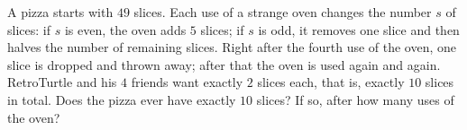 A pizza starts with $49$ slices. Each use of a strange oven changes the number $s$ of slices: if $s$ is even, the oven adds $5$ slices; if $s$ is odd, it removes one slice and then halves the number of remaining slices. Right after the fourth use of the oven, one slice is dropped and thrown away; after that the oven is used again and again. RetroTurtle and his $4$ friends want exactly $2$ slices each, that is, exactly $10$ slices in total. Does the pizza ever have exactly $10$ slices? If so, after how many uses of the oven?
